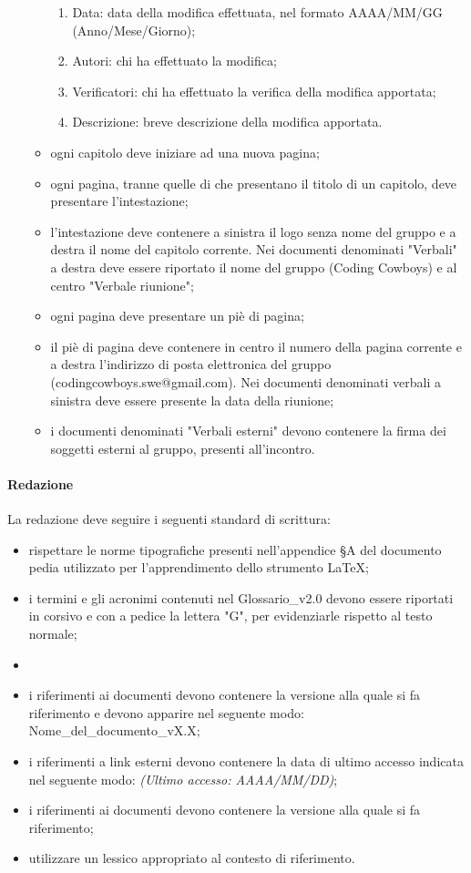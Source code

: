 \begin{enumerate}
\begin{itemize}
\begin{enumerate}
            \item Data: data della modifica effettuata, nel formato AAAA/MM/GG (Anno/Mese/Giorno);
            \item Autori: chi ha effettuato la modifica;
            \item Verificatori: chi ha effettuato la verifica della modifica apportata;
            \item Descrizione: breve descrizione della modifica apportata.
        \end{enumerate}
        \item ogni capitolo deve iniziare ad una nuova pagina;
        \item ogni pagina, tranne quelle di che presentano il titolo di un capitolo, deve presentare l'intestazione;
        \item l'intestazione deve contenere a sinistra il logo senza nome del gruppo e a destra il nome del capitolo corrente. Nei documenti denominati "Verbali" a destra deve essere riportato il nome del gruppo (Coding Cowboys) e al centro "Verbale riunione";
        \item ogni pagina deve presentare un piè di pagina;
        \item il piè di pagina deve contenere in centro il numero della pagina corrente e a destra l'indirizzo di posta elettronica del gruppo (codingcowboys.swe@gmail.com). Nei documenti denominati verbali a sinistra deve essere presente la data della riunione;
        \item i documenti denominati "Verbali esterni" devono contenere la firma dei soggetti esterni al gruppo, presenti all'incontro.
    \end{itemize}
\end{enumerate}

\paragraph{Redazione}
La redazione deve seguire i seguenti standard di scrittura:
\begin{itemize}
    \item rispettare le norme tipografiche presenti nell'appendice §A del documento pedia utilizzato per l'apprendimento dello strumento \LaTeX;
    \item i termini e gli acronimi contenuti nel Glossario\_v2.0 devono essere riportati in corsivo e con a pedice la lettera "G", per evidenziarle rispetto al testo normale;
    \item  \item i riferimenti ai documenti devono contenere la versione alla quale si fa riferimento e devono apparire nel seguente modo: Nome\_del\_documento\_vX.X;
    \item i riferimenti a link esterni devono contenere la data di ultimo accesso indicata nel seguente modo: \textit{(Ultimo accesso: AAAA/MM/DD)};
    \item i riferimenti ai documenti devono contenere la versione alla quale si fa riferimento;
    \item utilizzare un lessico appropriato al contesto di riferimento.
\end{itemize}

